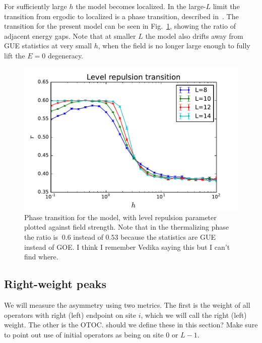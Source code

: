 \documentclass[aps,prx,reprint,superscriptaddress, longbibliography]{revtex4-1}
\newcommand{\charlie}[1]{ {\color{Magenta} {{#1}}}}
\begin{document}
For sufficiently large $h$ the model becomes localized. In the large-$L$ limit the transition from ergodic to localized is a phase transition, described in~\cite{1010.1992v1}. The transition for the present model can be seen in Fig.~\ref{fig:levelrepultrans}, showing the ratio of adjacent energy gaps. Note that at smaller $L$ the model also drifts away from GUE statistics at very small $h$, when the field is no longer large enough to fully lift the $E=0$ degeneracy.

\begin{figure}
	\includegraphics[width=\columnwidth]{levelrepultrans}
	\caption{Phase transition for the model, with level repulsion parameter plotted against field strength. Note that in the thermalizing phase the ratio is $~0.6$ instead of $0.53$ because the statistics are GUE instead of GOE. \charlie{I think I remember Vedika saying this but I can't find where.}}
	\label{fig:levelrepultrans}
\end{figure}

\subsection{Right-weight peaks}

We will measure the asymmetry using two metrics. The first is the weight of all operators with right (left) endpoint on site $i$, which we will call the right (left) weight. The other is the OTOC. \charlie{should we define these in this section?} \charlie{Make sure to point out use of initial operators as being on site 0 or $L-1$}.
\end{document}
